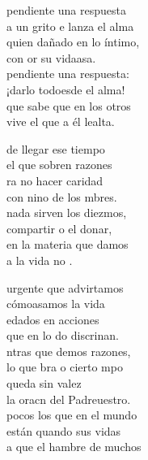 \begin{cancion}%
	 pendiente una respuesta \\
	a un grito e lanza el alma\\
	quien dañado en lo íntimo, \\
	con or su vidaasa.\\
	 pendiente una respuesta: \\
	¡darlo todoesde el alma!\\
	que sabe que en los otros \\
	vive el  que a él lealta.\jump\\
	\begin{chorus}%
		de llegar ese tiempo \\
		el que sobren razones\\
		ra no hacer caridad \\
		con nino de los mbres.\\
		nada sirven los diezmos,\\
		compartir o el donar,\\
		 en la materia que damos\\
		a la vida no .   \jump\\
	\end{chorus}%
	urgente que advirtamos \\
	cómoasamos la vida\\
	edados en acciones \\
	que en lo do discrinan.\\
	ntras que demos razones, \\
	lo que bra o cierto mpo\\
	queda sin valez \\
	la oracn del Padreuestro.\\
	\jump
	 pocos los que en el mundo \\
	están quando sus vidas\\
	a que el hambre de muchos \\

\end{cancion}
